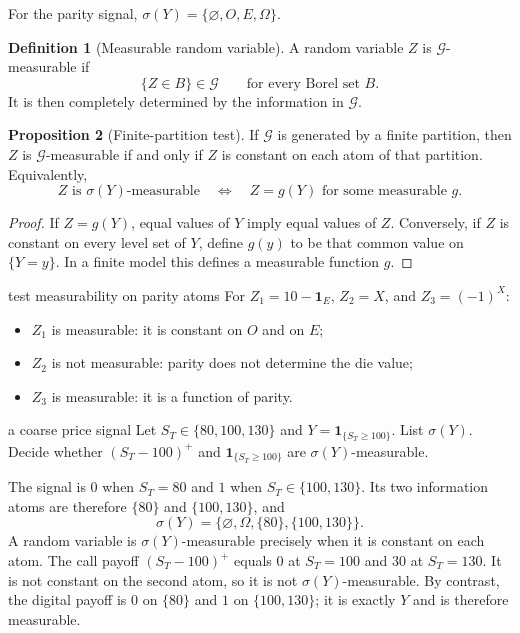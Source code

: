 \documentclass[10pt]{article}
\newcommand{\1}{\mathbf 1}
\newcommand{\cG}{\mathcal G}
\theoremstyle{definition}
\newtheorem{definition}{Definition}[section]
\newtheorem{proposition}[definition]{Proposition}
\begin{document}
For the parity signal,
$\sigma(Y)=\{\varnothing,O,E,\Omega\}$.

\begin{definition}[Measurable random variable]
A random variable $Z$ is $\cG$-measurable if
\[
\{Z\in B\}\in\cG
\qquad\text{for every Borel set }B.
\]
It is then completely determined by the information in $\cG$.
\end{definition}

\begin{proposition}[Finite-partition test]
If $\cG$ is generated by a finite partition, then $Z$ is $\cG$-measurable if
and only if $Z$ is constant on each atom of that partition. Equivalently,
\[
Z\text{ is }\sigma(Y)\text{-measurable}
\quad\Longleftrightarrow\quad
Z=g(Y)
\text{ for some measurable }g.
\]
\end{proposition}

\begin{proof}
If $Z=g(Y)$, equal values of $Y$ imply equal values of $Z$. Conversely, if $Z$
is constant on every level set of $Y$, define $g(y)$ to be that common value
on $\{Y=y\}$. In a finite model this defines a measurable function $g$.
\end{proof}

\begin{boardexample}{test measurability on parity atoms}
For $Z_1=10-\1_E$, $Z_2=X$, and $Z_3=(-1)^X$:
\begin{itemize}
  \item $Z_1$ is measurable: it is constant on $O$ and on $E$;
  \item $Z_2$ is not measurable: parity does not determine the die value;
  \item $Z_3$ is measurable: it is a function of parity.
\end{itemize}
\end{boardexample}

\begin{studentexercise}{a coarse price signal}
Let $S_T\in\{80,100,130\}$ and $Y=\1_{\{S_T\ge100\}}$. List
$\sigma(Y)$. Decide whether $(S_T-100)^+$ and $\1_{\{S_T\ge100\}}$ are
$\sigma(Y)$-measurable.
\end{studentexercise}
\begin{shortsolution}
The signal is $0$ when $S_T=80$ and $1$ when $S_T\in\{100,130\}$. Its two
information atoms are therefore $\{80\}$ and $\{100,130\}$, and
\[
\sigma(Y)=\{\varnothing,\Omega,\{80\},\{100,130\}\}.
\]
A random variable is $\sigma(Y)$-measurable precisely when it is constant on
each atom. The call payoff $(S_T-100)^+$ equals $0$ at $S_T=100$ and $30$ at
$S_T=130$. It is not constant on the second atom, so it is not
$\sigma(Y)$-measurable. By contrast, the digital payoff is $0$ on $\{80\}$
and $1$ on $\{100,130\}$; it is exactly $Y$ and is therefore measurable.
\end{shortsolution}
\end{document}

